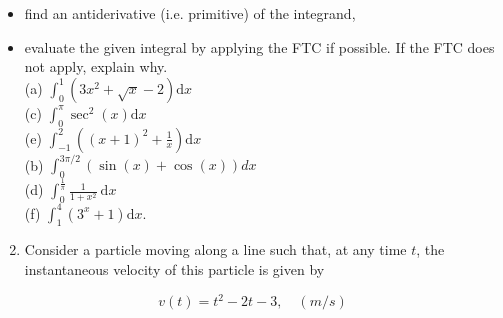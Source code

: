 \documentclass[10pt]{article}
\begin{document}
\begin{itemize}
  \item find an antiderivative (i.e. primitive) of the integrand,
  \item evaluate the given integral by applying the FTC if possible. If the FTC does not apply, explain why.\\
(a) $\int_{0}^{1}\left(3 x^{2}+\sqrt{x}-2\right) \mathrm{d} x$\\
(c) $\int_{0}^{\pi} \sec ^{2}(x) \mathrm{d} x$\\
(e) $\int_{-1}^{2}\left((x+1)^{2}+\frac{1}{x}\right) \mathrm{d} x$\\
(b) $\int_{0}^{3 \pi / 2}(\sin (x)+\cos (x)) d x$\\
(d) $\int_{0}^{\frac{1}{\pi}} \frac{1}{1+x^{2}} \mathrm{~d} x$\\
(f) $\int_{1}^{4}\left(3^{x}+1\right) \mathrm{d} x$.
\end{itemize}

\begin{enumerate}
  \setcounter{enumi}{1}
  \item Consider a particle moving along a line such that, at any time $t$, the instantaneous velocity of this particle is given by
\end{enumerate}

$$
v(t)=t^{2}-2 t-3, \quad(m / s)
$$
\end{document}
